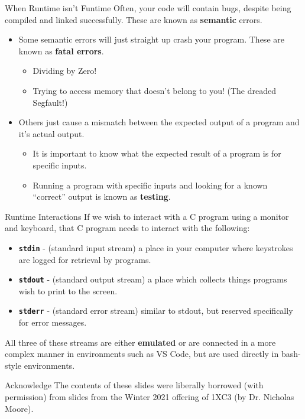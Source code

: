 \documentclass[11pt]{beamer}
\begin{document}
\begin{frame}{When Runtime isn't Funtime}
Often, your code will contain bugs, despite being compiled and linked successfully.  These are known as \textbf{semantic} errors.
\begin{itemize}
\item Some semantic errors will just straight up crash your program. These are known as \textbf{fatal errors}.
	\begin{itemize}
	\item Dividing by Zero!
	\item Trying to access memory that doesn't belong to you! (The dreaded Segfault!)
	\end{itemize}
\item Others just cause a mismatch between the expected output of a program and it's actual output.  
	\begin{itemize}
	\item It is important to know what the expected result of a program is for specific inputs.
	\item Running a program with specific inputs and looking for a known ``correct'' output is known as \textbf{testing}.
	\end{itemize}
\end{itemize}
\end{frame}

\begin{frame}{Runtime Interactions}
If we wish to interact with a C program using a monitor and keyboard, that C program needs to interact with the following:
\begin{itemize}
\item \textbf{\texttt{stdin}} - (standard input stream) a place in your computer where keystrokes are logged for retrieval by programs.
\item \textbf{\texttt{stdout}} - (standard output stream) a place which collects things programs wish to print to the screen.  
\item \textbf{\texttt{stderr}} - (standard error stream) similar to stdout, but reserved specifically for error messages.  
\end{itemize}

All three of these streams are either \textbf{emulated} or are connected in a more complex manner in environments such as VS Code, but are used directly in bash-style environments.
\end{frame}

\begin{frame}{Acknowledge}
\center
\vspace{8em}
The contents of these slides were liberally borrowed (with permission) from slides from the Winter 2021 offering of 1XC3 (by Dr. Nicholas Moore).  
\end{frame}
\end{document}
